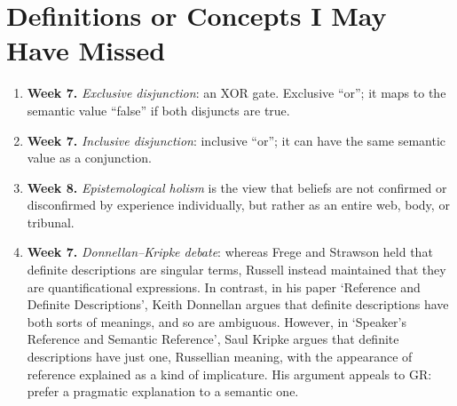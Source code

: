 \chapter{Definitions or Concepts I May Have Missed}

\begin{enumerate}
  \item \textbf{Week 7.} \emph{Exclusive disjunction}: an XOR gate. Exclusive ``or''; it maps to the semantic value ``false'' if both disjuncts are true.
  \item \textbf{Week 7.} \emph{Inclusive disjunction}: inclusive ``or''; it can have the same semantic value as a conjunction.
  \item \textbf{Week 8.} \emph{Epistemological holism} is the view that beliefs are not confirmed or disconfirmed by experience individually, but rather as an entire web, body, or tribunal.
  \item \textbf{Week 7.} \emph{Donnellan--Kripke debate}: whereas Frege and Strawson held that definite descriptions are singular terms, Russell instead maintained that they are quantificational expressions. In contrast, in his paper `Reference and Definite Descriptions', Keith Donnellan argues that definite descriptions have both sorts of meanings, and so are ambiguous. However, in `Speaker's Reference and Semantic Reference', Saul Kripke argues that definite descriptions have just one, Russellian meaning, with the appearance of reference explained as a kind of implicature. His argument appeals to GR: prefer a pragmatic explanation to a semantic one.
\end{enumerate}
